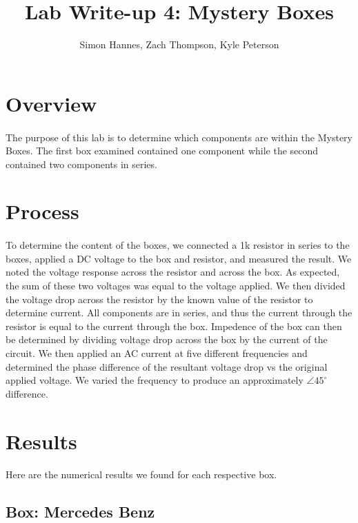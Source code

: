 \documentclass{article}
\title{Lab Write-up 4: Mystery Boxes}
\author{Simon Hannes, Zach Thompson, Kyle Peterson}
\begin{document}
\maketitle{}

\section*{Overview}
\paragraph{}
The purpose of this lab is to determine which components are within the Mystery Boxes. The first box examined contained one component while the second contained two components in series. 

\section*{Process}
\paragraph{}
To determine the content of the boxes, we connected a 1k resistor in series to the boxes, applied a DC voltage to the box and resistor, and measured the result. We noted the voltage response across the resistor and across the box. As expected, the sum of these two voltages was equal to the voltage applied. We then divided the voltage drop across the resistor by the known value of the resistor to determine current. All components are in series, and thus the current through the resistor is equal to the current through the box. Impedence of the box can then be determined by dividing voltage drop across the box by the current of the circuit. We then applied an AC current at five different frequencies and determined the phase difference of the resultant voltage drop vs the original applied voltage. We varied the frequency to produce an approximately $\angle{}45^\circ{}$ difference. 

\section*{Results}
\paragraph{}
Here are the numerical results we found for each respective box.

\subsection*{Box: Mercedes Benz}
\end{document}
